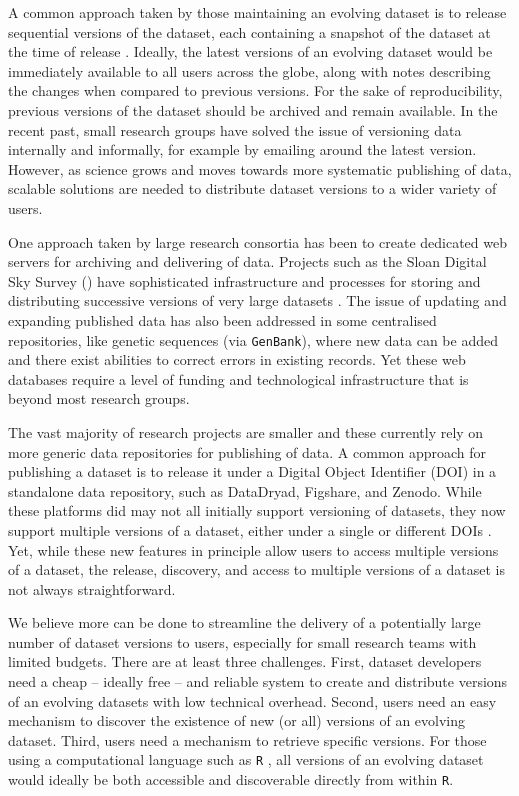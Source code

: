 \documentclass[a4paper,num-refs]{assets/oup-contemporary}
\begin{document}
A common approach taken by those maintaining an evolving dataset is to release sequential versions of the dataset, each containing a snapshot of the dataset at the time of release \cite[e.g.][]{Falster-2015, Pennell-2015a, Yenni-2018, Abolfathi-2018}. Ideally, the latest versions of an evolving dataset would be immediately available to all users across the globe, along with notes describing the changes when compared to previous versions. For the sake of reproducibility, previous versions of the dataset should be archived and remain available. In the recent past, small research groups have solved the issue of versioning data internally and informally, for example by emailing around the latest version. However, as science grows and moves towards more systematic publishing of data, scalable solutions are needed to distribute dataset versions to a wider variety of users.

One approach taken by large research consortia has been to create dedicated web servers for archiving and delivering of data. Projects such as the Sloan Digital Sky Survey () have sophisticated infrastructure and processes for storing and distributing successive versions of very large datasets \cite{Abolfathi-2018}. The issue of updating and expanding published data has also been addressed in some centralised repositories, like genetic sequences (via \texttt{GenBank}), where new data can be added and there exist abilities to correct errors in existing records. Yet these web databases require a level of funding and technological infrastructure that is beyond most research groups.

The vast majority of research projects are smaller and these currently rely on more generic data repositories for publishing of data. A common approach for publishing a dataset is to release it under a Digital Object Identifier (DOI) in a standalone data repository, such as DataDryad, Figshare, and Zenodo. While these platforms did may not all initially support versioning of datasets, they now support multiple versions of a dataset, either under a single or different DOIs \cite{Nielsen-2017}. Yet, while these new features in principle allow users to access multiple versions of a dataset, the release, discovery, and access to multiple versions of a dataset is not always straightforward.

We believe more can be done to streamline the delivery of a potentially large number of dataset versions to users, especially for small research teams with limited budgets. There are at least three challenges. First, dataset developers need a cheap -- ideally free -- and reliable system  to create and distribute versions of an evolving datasets with low technical overhead. Second, users need an easy mechanism to discover the existence of new (or all) versions of an evolving dataset. Third, users need a mechanism to retrieve specific versions. For those using a computational language such as \texttt{R} \cite{R-2017}, all versions of an evolving dataset would ideally be both accessible and discoverable directly from within \texttt{R}.
\end{document}
